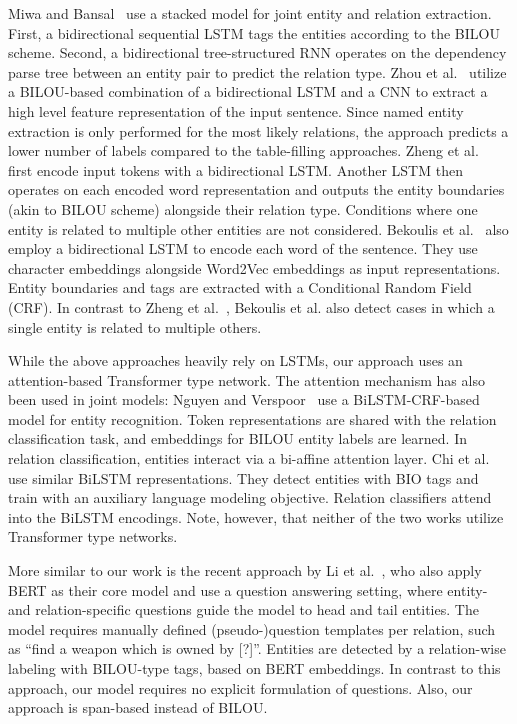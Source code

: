 \documentclass{ecai}
\begin{document}
 Miwa and Bansal~\cite{miwa:2016:stacked_rnn} use a stacked model for joint entity and relation extraction. First, a bidirectional sequential LSTM tags the entities according to the BILOU scheme. Second, a  bidirectional tree-structured RNN operates on the dependency parse tree between an entity pair to predict the relation type. Zhou et al.~\cite{zhou:2017:joint_hybrid} utilize a BILOU-based combination of a bidirectional LSTM and a CNN to extract a high level feature representation of the input sentence.
Since named entity extraction is only performed for the most likely relations, the approach predicts a lower number of labels compared to the table-filling approaches. 
Zheng et al.~\cite{zheng:2017:joint_novel_tagging} first encode input tokens with a bidirectional LSTM. Another LSTM then operates on each encoded word representation and outputs the entity boundaries (akin to BILOU scheme) alongside their relation type.
Conditions where one entity is related to multiple other entities are not considered.
Bekoulis et al.~\cite{bekoulis:2018:multi_head, bekoulis:2018:adversarial} also employ a bidirectional LSTM to encode each word of the sentence. They use character embeddings alongside Word2Vec embeddings as input representations. Entity boundaries and tags are extracted with a Conditional Random Field (CRF). In contrast to Zheng et al.~\cite{zheng:2017:joint_novel_tagging}, Bekoulis et al. also detect cases in which a single entity is related to multiple others. 



While the above approaches heavily rely on LSTMs, our approach uses an attention-based Transformer type network. The attention mechanism has also been used in joint models: Nguyen and Verspoor~\cite{nguyen:2019:biaffine_attention} use a BiLSTM-CRF-based model for entity recognition. 
Token representations are shared with the relation classification task, and embeddings for BILOU entity labels are learned. In relation classification, entities interact via a bi-affine attention layer. 
Chi et al.~\cite{chi:2019:hierarch_attention} use similar BiLSTM representations. They detect entities with BIO tags and train with an auxiliary language modeling objective. Relation classifiers
attend into the BiLSTM encodings.
Note, however, that neither of the two works utilize Transformer type networks.

More similar to our work is the recent approach by Li et al.~\cite{li:2019:joint_bert}, who also apply BERT as their core model and use a question answering setting, where entity- and relation-specific questions guide the model to head and tail entities. The model requires manually defined (pseudo-)question templates per relation, such as ``find a weapon which is owned by [?]''. Entities are detected by a relation-wise labeling with BILOU-type tags, based on BERT embeddings. In contrast to this approach, our model requires no explicit formulation of questions. Also, our approach is span-based instead of BILOU.
\end{document}
